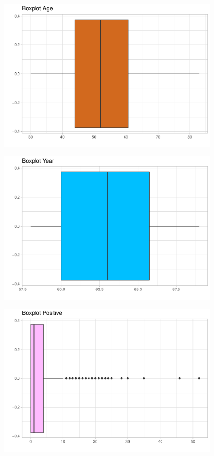 \begin{figure}[H]\includegraphics[width=.9\linewidth]{img/EDA2_files/figure-latex/unnamed-chunk-11-1} \end{figure}

\begin{figure}[H]\includegraphics[width=.9\linewidth]{img/EDA2_files/figure-latex/unnamed-chunk-11-2} \end{figure}

\begin{figure}[H]\includegraphics[width=.9\linewidth]{img/EDA2_files/figure-latex/unnamed-chunk-11-3} \end{figure}

